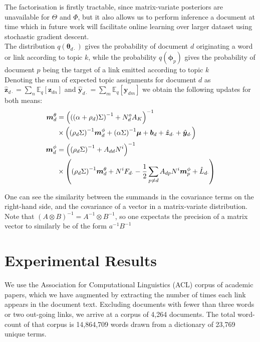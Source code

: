 \documentclass{sciposter}
\newcommand \ex[2] {
    \mathbb{E}_{ { #2 } }\left[ #1 \right]
}
\newcommand \halve[1] {
	\frac{#1}{2}
}
\newcommand \half {
    \halve{1}
}
\newcommand \vv[1] { \bm #1 }
\newcommand \inv[1] { {#1}^{-1} }
\newcommand \invb[1] { \inv{\left( #1 \right)} }
\newcommand \thdo { { \vv{\theta}_{d\cdot} } }
\begin{document}
\begin{multicols}{3}
The factorisation is firstly tractable, since matrix-variate posteriors are unavailable for $\Theta$ and $\Phi$, but it also allows us to perform inference a document at time which in future work will facilitate online learning over larger dataset using stochastic gradient descent. \\

The distribution $q(\thdo)$ gives the probability of document $d$ originating a word or link according to topic $k$, while the probability $q(\vv{\phi}_p)$ gives the probability of document $p$ being the target of a link emitted according to topic $k$\\

Denoting the sum of expected topic assignments for document $d$ as $\hat{\vv{z}}_{d\cdot} = \sum_n \ex{\vv{z}_{dn}}{q}$ and $\hat{\vv{y}}_{d\cdot} = \sum_m \ex{\vv{y}_{dm}}{q}$ we obtain the following updates for both means:
\begin{align*}
\mtd &= \invb{ \invb{(\alpha + \rho_d)\Sigma} + N^o_d A_K } \\
    & \times
            \left(
                \invb{\rho_d \Sigma} \mpd
                + \invb{\alpha \Sigma}\vv{\mu}
                + \vv{b}_d 
                + \hat{\vv{z}}_{d\cdot}
                + \hat{\vv{y}}_{d\cdot}
            \right) \\
 \mpd & = \invb{\invb{\rho_d \Sigma} + A_{dd}N^i} \\
  & \times
             \left(
                 \invb{\rho_d \Sigma}\mtd + N^i F_{d\cdot} -\half \sum_{p \neq d} A_{dp} N^i \vv{m}^\phi_p + \hat{L}_{d\cdot}
             \right)
 \end{align*}
 
One can see the similarity between the summands in the covariance terms on the right-hand side, and the covariance of a vector in a matrix-variate distribution. Note that $\invb{A\otimes B} = \inv{A} \otimes \inv{B}$, so one expectats the precision of a matrix vector to similarly be of the form $\inv{a}\inv{B}$

\section{Experimental Results}

We use the Association for Computational Linguistics (ACL) corpus of academic papers, which we have augmented by extracting the number of times each link appears in the document text. Excluding documents with fewer than three words or two out-going links, we arrive at a corpus of 4,264 documents. The total word-count of that corpus is 14,864,709 words drawn from a dictionary of 23,769 unique terms. 


\end{multicols}
\end{document}
